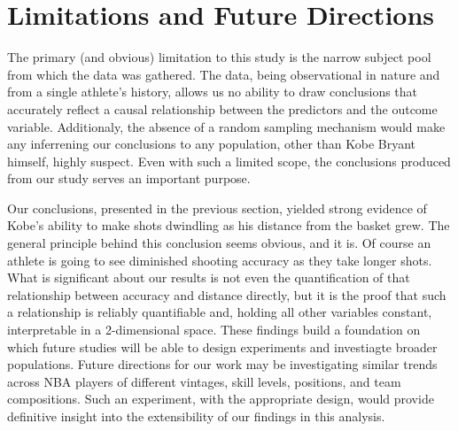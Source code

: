 \chapter{Limitations and Future Directions}\label{chap:discussion}

The primary (and obvious) limitation to this study is the narrow subject pool from which the data was gathered.  The data, being observational in nature and from a single athlete's history, allows us no ability to draw conclusions that accurately reflect a causal relationship between the predictors and the outcome variable. Additionaly, the absence of a random sampling mechanism would make any inferrening our conclusions to any population, other than Kobe Bryant himself, highly suspect.  Even with such a limited scope, the conclusions produced from our study serves an important purpose.  \par
%
Our conclusions, presented in the previous section, yielded strong evidence of Kobe's ability to make shots dwindling as his distance from the basket grew. The general principle behind this conclusion seems obvious, and it is.  Of course an athlete is going to see diminished shooting accuracy as they take longer shots.  What is significant about our results is not even the quantification of that relationship between accuracy and distance directly, but it is the proof that such a relationship is reliably quantifiable and, holding all other variables constant, interpretable in a 2-dimensional space.  These findings build a foundation on which future studies will be able to design experiments and investiagte broader populations. Future directions for our work may be investigating similar trends across NBA players of different vintages, skill levels, positions, and team compositions.  Such an experiment, with the appropriate design, would provide definitive insight into the extensibility of our findings in this analysis.



